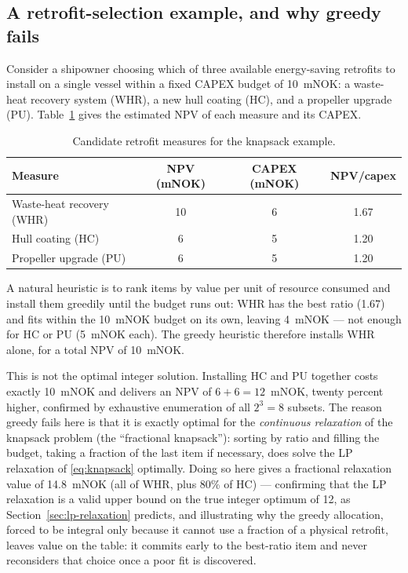 \subsection{A retrofit-selection example, and why greedy fails}

Consider a shipowner choosing which of three available energy-saving
retrofits to install on a single vessel within a fixed CAPEX budget of
10~mNOK: a waste-heat recovery system (WHR), a new hull coating (HC), and
a propeller upgrade (PU). Table~\ref{tab:knapsack-retrofit} gives the
estimated NPV of each measure and its CAPEX.

\begin{table}[htbp]
\centering
\caption{Candidate retrofit measures for the knapsack example.}
\label{tab:knapsack-retrofit}
\begin{tabular}{@{}lccc@{}}
\toprule
Measure & NPV (mNOK) & CAPEX (mNOK) & NPV/capex \\
\midrule
Waste-heat recovery (WHR) & 10 & 6 & 1.67 \\
Hull coating (HC) & 6 & 5 & 1.20 \\
Propeller upgrade (PU) & 6 & 5 & 1.20 \\
\bottomrule
\end{tabular}
\end{table}

A natural heuristic is to rank items by value per unit of resource
consumed and install them greedily until the budget runs out: WHR has the
best ratio (1.67) and fits within the 10~mNOK budget on its own, leaving
4~mNOK --- not enough for HC or PU (5~mNOK each). The greedy heuristic
therefore installs WHR alone, for a total NPV of 10~mNOK.

This is not the optimal integer solution. Installing HC and PU together
costs exactly 10~mNOK and delivers an NPV of $6+6=12$~mNOK, twenty percent
higher, confirmed by exhaustive enumeration of all $2^3=8$ subsets. The
reason greedy fails here is that it is exactly optimal for the
\emph{continuous relaxation} of the knapsack problem (the ``fractional
knapsack''): sorting by ratio and filling the budget, taking a fraction of
the last item if necessary, does solve the LP relaxation of
\eqref{eq:knapsack} optimally. Doing so here gives a fractional relaxation
value of 14.8~mNOK (all of WHR, plus 80\% of HC) --- confirming that the
LP relaxation is a valid upper bound on the true integer optimum of 12, as
Section~\ref{sec:lp-relaxation} predicts, and illustrating why the greedy
allocation, forced to be integral only because it cannot use a fraction of
a physical retrofit, leaves value on the table: it commits early to the
best-ratio item and never reconsiders that choice once a poor fit is
discovered.

